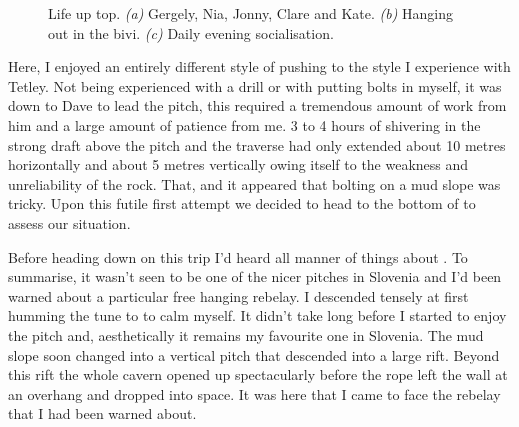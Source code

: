 \begin{figure}[t!]
        \begin{subfigure}[t]{\textwidth}
            \centering
            \caption{} \label{cloudy sunset}
        \end{subfigure}
        
        \caption{Life up top. \textit{(a)} Gergely, Nia, Jonny, Clare and Kate.
            \textit{(b)} Hanging out in the bivi. 
            \textit{(c)} Daily evening socialisation. 
        }
    \end{figure}

Here, I enjoyed an entirely different style of pushing to the style I
experience with Tetley. Not being experienced with a drill or with
putting bolts in myself, it was down to Dave to lead the pitch, this
required a tremendous amount of work from him and a large amount of
patience from me. 3 to 4 hours of shivering in the strong draft above
the pitch and the traverse had only extended about 10 metres
horizontally and about 5 metres vertically owing itself to the weakness
and unreliability of the rock. That, and it appeared that bolting on a
mud slope was tricky. Upon this futile first attempt we decided to head
to the bottom of  to assess our situation.

Before heading down on this trip I'd heard all manner of things about
. To summarise, it wasn't seen to be one
of the nicer pitches in Slovenia and I'd been warned about a particular
free hanging rebelay. I descended tensely at first humming the tune to
 to calm myself. It didn't take long
before I started to enjoy the pitch and, aesthetically it remains my
favourite one in Slovenia. The mud slope soon changed into a vertical
pitch that descended into a large rift. Beyond this rift the whole
cavern opened up spectacularly before the rope left the wall at an
overhang and dropped into space. It was here that I came to face the
rebelay that I had been warned about.

